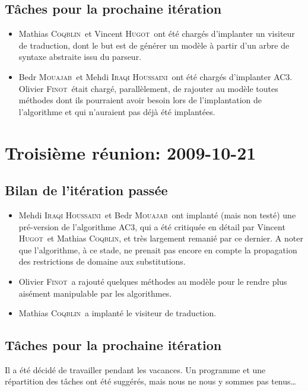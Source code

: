 \documentclass[a4paper,12pt]{article}
\def\familyname{\textsc}
\def\firstname#1{#1}
\def\groupmember#1#2{\firstname{#1} \familyname{#2}}
\def\mmat{\groupmember{Mathias}{Coqblin}}
\def\moli{\groupmember{Olivier}{Finot}}
\def\mvin{\groupmember{Vincent}{Hugot}}
\def\mmed{\groupmember{Mehdi}{Iraqi Houssaini}}
\def\mbed{\groupmember{Bedr}{Mouajab}}
\begin{document}
\subsection{Tâches pour la prochaine itération}

\begin{itemize}
 \item \mmat\ et \mvin\ ont été chargés d'implanter un visiteur
de traduction, dont le but est de générer un modèle à partir 
d'un arbre de syntaxe abstraite issu du parseur.

\item \mbed\ et \mmed\ ont été chargés d'implanter AC3. \moli\
était chargé, parallèlement, de rajouter au modèle
toutes méthodes dont ils pourraient avoir besoin lors de
l'implantation de l'algorithme et qui n'auraient pas
déjà été implantées.

\end{itemize}



\section{Troisième réunion: 2009-10-21}

\subsection{Bilan de l'itération passée}

\begin{itemize}
 \item \mmed\ et \mbed\ ont implanté (mais non testé) une pré-version de 
 l'algorithme AC3, qui a été critiquée en détail par \mvin\ et \mmat, et très
 largement remanié par ce dernier.
 A noter que l'algorithme, à ce stade, ne prenait pas encore en compte la
 propagation des restrictions de domaine aux substitutions.
\item \moli\ a rajouté quelques méthodes au modèle pour le rendre plus aisément
manipulable par les algorithmes.
\item \mmat\ a implanté le visiteur de traduction.
\end{itemize}


\subsection{Tâches pour la prochaine itération}

Il a été décidé de travailler pendant les vacances. Un programme
et une répartition des tâches ont été suggérés, mais nous ne nous y sommes pas 
tenus\dots
\end{document}
